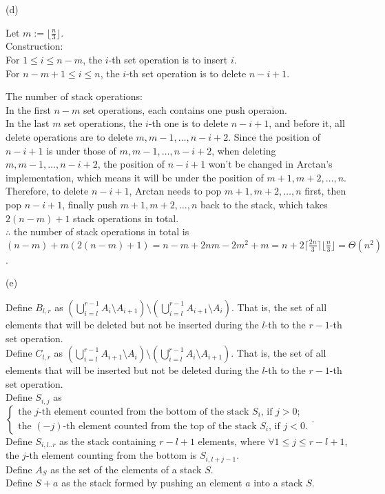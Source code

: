 \begin{pr}$ $\\
(d)

Let $m:=\lfloor\frac n3\rfloor$.\\
Construction:\\
For $1\leq i\leq n-m$, the $i$-th set operation is to insert $i$.\\
For $n-m+1\leq i\leq n$, the $i$-th set operation is to delete $n-i+1$.

The number of stack operations:\\
In the first $n-m$ set operations, each contains one push operaion.\\
In the last $m$ set operations, the $i$-th one is to delete $n-i+1$, and before it, all delete operations are to delete $m, m-1, \dots, n-i+2$. Since the position of $n-i+1$ is under those of $m, m-1, \dots, n-i+2$, when deleting $m, m-1, \dots, n-i+2$, the position of $n-i+1$ won't be changed in Arctan's implementation, which means it will be under the position of $m+1, m+2, \dots, n$. Therefore, to delete $n-i+1$, Arctan needs to pop $m+1, m+2, \dots, n$ first, then pop $n-i+1$, finally push $m+1, m+2, \dots, n$ back to the stack, which takes $2(n-m)+1$ stack operations in total.\\
$\therefore$ the number of stack operations in total is $(n-m)+m(2(n-m)+1)=n-m+2nm-2m^2+m=n+2\lceil\frac{2n}3\rceil\lfloor\frac n3\rfloor=\Theta(n^2)$.

(e)

Define $B_{l, r}$ as $\left(\bigcup_{i=l}^{r-1}A_i\setminus A_{i+1}\right)\setminus\left(\bigcup_{i=l}^{r-1}A_{i+1}\setminus A_i\right)$. That is, the set of all elements that will be deleted but not be inserted during the $l$-th to the $r-1$-th set operation.\\
Define $C_{l, r}$ as $\left(\bigcup_{i=l}^{r-1}A_{i+1}\setminus A_i\right)\setminus\left(\bigcup_{i=l}^{r-1}A_i\setminus A_{i+1}\right)$. That is, the set of all elements that will be inserted but not be deleted during the $l$-th to the $r-1$-th set operation.\\
Define $S_{i, j}$ as $\begin{cases}
\text{the }j\text{-th element counted from the bottom of the stack }S_i\text{, if }j>0;\\
\text{the }(-j)\text{-th element counted from the top of the stack }S_i\text{, if }j<0.
\end{cases}$.\\
Define $S_{i, l..r}$ as the stack containing $r-l+1$ elements, where $\forall1\leq j\leq r-l+1$, the $j$-th element counting from the bottom is $S_{i, l+j-1}$.\\
Define $A_S$ as the set of the elements of a stack $S$.\\
Define $S+a$ as the stack formed by pushing an element $a$ into a stack $S$.


\end{pr}
